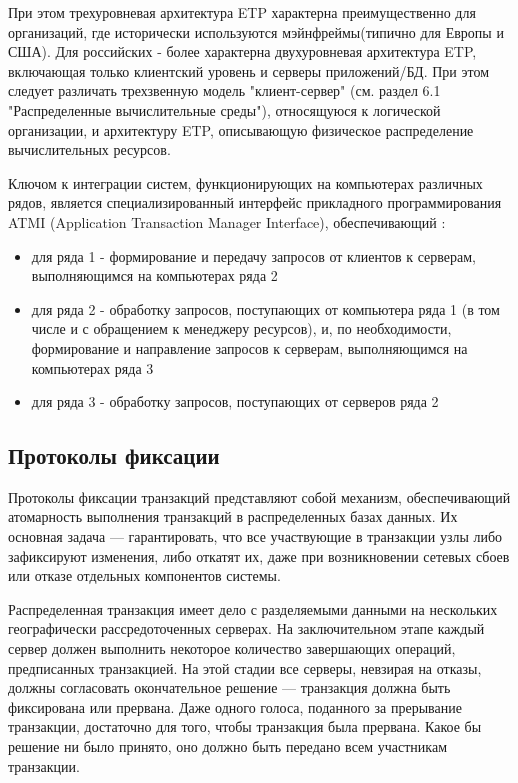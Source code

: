 При этом трехуровневая архитектура ETP характерна преимущественно для организаций, где исторически используются мэйнфреймы(типично для Европы 
и США). Для российских - более характерна двухуровневая архитектура ETP, включающая только клиентский уровень и серверы приложений/БД. При 
этом следует различать трехзвенную модель "клиент-сервер" (см. раздел 6.1 "Распределенные вычислительные среды"), относящуюся к логической 
организации, и архитектуру ETP, описывающую физическое распределение вычислительных ресурсов.

Ключом к интеграции систем, функционирующих на компьютерах различных рядов, является специализированный
интерфейс прикладного программирования ATMI (Application Transaction Manager Interface), обеспечивающий \autocite{TransactionMonitors}:
\begin{itemize}
    \item для ряда 1 - формирование и передачу запросов от клиентов к серверам, выполняющимся на компьютерах ряда 2
    \item для ряда 2 - обработку запросов, поступающих от компьютера ряда 1 (в том числе и с
    обращением к менеджеру ресурсов), и, по необходимости, формирование и направление
    запросов к серверам, выполняющимся на компьютерах ряда 3
    \item для ряда 3 - обработку запросов, поступающих от серверов ряда 2
\end{itemize}

\subsection{Протоколы фиксации}

Протоколы фиксации транзакций представляют собой механизм, обеспечивающий атомарность 
выполнения транзакций в распределенных базах данных. Их основная задача — гарантировать, что все участвующие в 
транзакции узлы либо зафиксируют изменения, либо откатят их, даже при возникновении сетевых сбоев или отказе отдельных 
компонентов системы. \autocite{FixProtocols}

Распределенная транзакция имеет дело с разделяемыми данными на нескольких географически рассредоточенных серверах. 
На заключительном этапе каждый сервер должен выполнить некоторое количество завершающих операций, предписанных транзакцией. 
На этой стадии все серверы, невзирая на отказы, должны согласовать окончательное решение — транзакция должна быть фиксирована 
или прервана. Даже одного голоса, поданного за прерывание транзакции, достаточно для того, чтобы транзакция была прервана.
 Какое бы решение ни было принято, оно должно быть передано всем участникам транзакции. 
 
